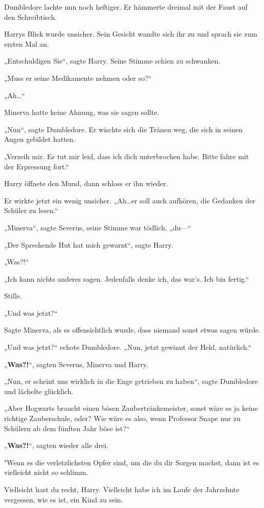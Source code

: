 {Dumbledore lachte nun noch heftiger. Er hämmerte dreimal mit der Faust auf den Schreibtisch.

Harrys Blick wurde unsicher. Sein Gesicht wandte sich ihr zu und sprach sie zum ersten Mal an.

„Entschuldigen Sie“, sagte Harry. Seine Stimme schien zu schwanken.

„Muss er seine Medikamente nehmen oder so?“

„Ah…“

Minerva hatte keine Ahnung, was sie sagen sollte.

„Nun“, sagte Dumbledore. Er wischte sich die Tränen weg, die sich in seinen Augen gebildet hatten.

„Verzeih mir. Es tut mir leid, dass ich dich unterbrochen habe. Bitte fahre mit der Erpressung fort.“

Harry öffnete den Mund, dann schloss er ihn wieder.

Er wirkte jetzt ein wenig unsicher. „Ah…er soll auch aufhören, die Gedanken der Schüler zu lesen.“

„Minerva“, sagte Severus, seine Stimme war tödlich, „du—“

„Der Sprechende Hut hat mich gewarnt“, sagte Harry.

„Was?!“

„Ich kann nichts anderes sagen. Jedenfalls denke ich, das war's. Ich bin fertig.“

Stille.

„Und was jetzt?“

Sagte Minerva, als es offensichtlich wurde, dass niemand sonst etwas sagen würde.

„Und was jetzt?“ echote Dumbledore. „Nun, jetzt gewinnt der Held, natürlich.“

„\textbf{Was?!}“, sagten Severus, Minerva und Harry.

„Nun, er scheint uns wirklich in die Enge getrieben zu haben“, sagte Dumbledore und lächelte glücklich.

„Aber Hogwarts braucht einen bösen Zaubertränkemeister, sonst wäre es ja keine richtige Zauberschule, oder? Wie wäre es also, wenn Professor Snape nur zu Schülern ab dem fünften Jahr böse ist?“

„\textbf{Was?!}“, sagten wieder alle drei.

"Wenn es die verletzlichsten Opfer sind, um die du dir Sorgen machst, dann ist es vielleicht nicht so schlimm.

Vielleicht hast du recht, Harry. Vielleicht habe ich im Laufe der Jahrzehnte vergessen, wie es ist, ein Kind zu sein.

}
